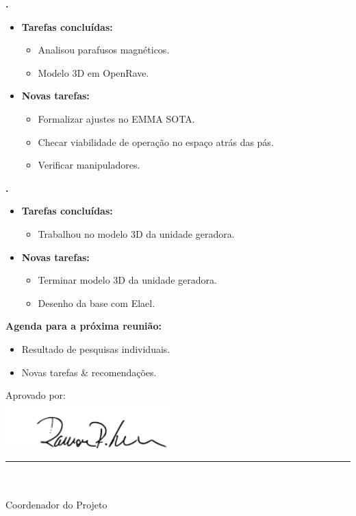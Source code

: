\textbf{\gabriel.} 
	\begin{itemize}
		\item \textbf{Tarefas concluídas:}
			\begin{itemize}    
				\item Analisou parafusos magnéticos.
				\item Modelo 3D em OpenRave.
			\end{itemize}
		
		\item \textbf{Novas tarefas:}
			\begin{itemize} 
				\item Formalizar ajustes no EMMA SOTA.
				\item Checar viabilidade de operação no espaço atrás das pás.
				\item Verificar manipuladores.
			\end{itemize} 
	\end{itemize}
					
			
   \textbf{.} 
	\begin{itemize}
		\item \textbf{Tarefas concluídas:}
			\begin{itemize}    
				\item Trabalhou no modelo 3D da unidade geradora.
			\end{itemize}
		
		\item \textbf{Novas tarefas:}
			\begin{itemize} 
			    \item Terminar modelo 3D da unidade geradora.
				\item Desenho da base com Elael.
			\end{itemize}
	\end{itemize}

			



\textbf{Agenda para a próxima reunião:}
  \begin{itemize}
    \item Resultado de pesquisas individuais.
    \item Novas tarefas \& recomendações.
  \end{itemize}


\vspace{5mm}%
\parbox[t]{70mm}{
  Aprovado por: \\[5mm]
  \centering
  \includegraphics[width=65mm]{figs/logo/assinatura-ramon.png} \\[-4mm]
  \rule[2mm]{70mm}{0.1mm} \\
  \ramon \\[1mm]
  Coordenador do Projeto \\
}

\fim